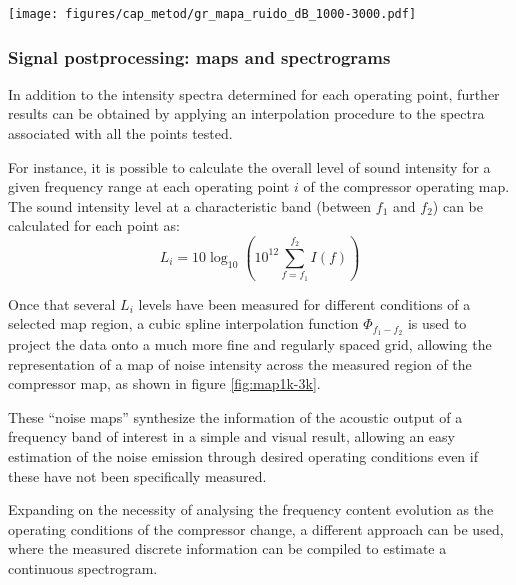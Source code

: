 \begin{figure*}[tp!]
\centering
\texttt{[image: figures/cap\_metod/gr\_mapa\_ruido\_dB\_1000-3000.pdf]}
\caption{Sample of noise level in the 1 -- 3 kHz band obtained through the processing described in subsection \ref{sub:noise_maps_and_spectrograms}, including the measured data points $(\circ)$ and the paths later expanded as spectrograms shown in figure \ref{fig:spec50-5k}. The left hand side map represents the inlet duct, whereas the right hand side map represents the outlet duct. }
\label{fig:map1k-3k}
\end{figure*}

\subsubsection{Signal postprocessing: maps and spectrograms}
\label{sub:noise_maps_and_spectrograms}

In addition to the intensity spectra determined for each operating point, further results can be obtained by applying an interpolation procedure to the spectra associated with all the points tested.

For instance, it is possible to calculate the overall level of sound intensity for a given frequency range at each operating point $i$ of the compressor operating map. The sound intensity level at a characteristic band (between $f_1$ and $f_2$) can be calculated for each point as:
\begin{equation}\label{eq:point_level}
  L_i=10\log_{10}\left(10^{12}\sum_{f=f_1}^{f_2}I(f)\right)
\end{equation}

Once that several $L_i$ levels have been measured for different conditions of a selected map region, a cubic spline interpolation function $\Phi_{f_1-f_2}$ is used to project the data onto a much more fine and regularly spaced grid, allowing the representation of a map of noise intensity across the measured region of the compressor map, as shown in figure \ref{fig:map1k-3k}.

These ``noise maps'' synthesize the information of the acoustic output of a frequency band of interest in a simple and visual result, allowing an easy estimation of the noise emission through desired operating conditions even if these have not been specifically measured.

Expanding on the necessity of analysing the frequency content evolution as the operating conditions of the compressor change, a different approach can be used, where the measured discrete information can be compiled to estimate a continuous spectrogram.


